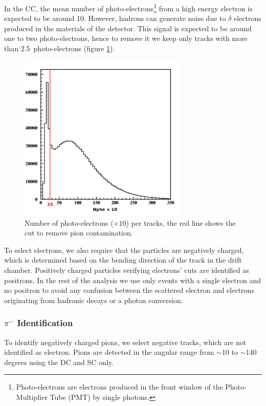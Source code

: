 In the CC, the mean number of photo-electrons\footnote{Photo-electrons are 
electrons produced in the front window of the Photo-Multiplier Tube (PMT) by 
single photons.} from a high energy electron is expected to be around 10.
However, hadrons can generate noise due to $\delta$ electrons produced in 
the materials of the detector. This signal is expected to be around 
one to two photo-electrons, hence to remove it we keep only tracks with more than 
2.5~photo-electrons (figure \ref{delta}). 

\begin{figure}[tbp]
\centering
\includegraphics[width=8cm] {chap5-fig/fig04.png} 
\caption {Number of photo-electrons ($\times 10$) per tracks, the red line 
shows the cut to remove pion contamination.}
\label{delta}
\end{figure}

To select electrons, we also require that the particles are negatively charged, 
which is determined based on the bending direction of the track in the drift chamber.
Positively charged particles verifying electrons' cuts are identified as 
positrons. In the rest of the 
analysis we use only events with a single electron and no positron to avoid any 
confusion between the scattered electron and electrons originating from hadronic decays or 
a photon conversion.

\subsubsection{$\pi^-$ Identification}
\label{PiId}

To identify negatively charged pions, we select negative tracks, which are not 
identified as electron. Pions are detected in the angular range from $\sim$10 to 
$\sim$140 degrees using the DC and SC only.

